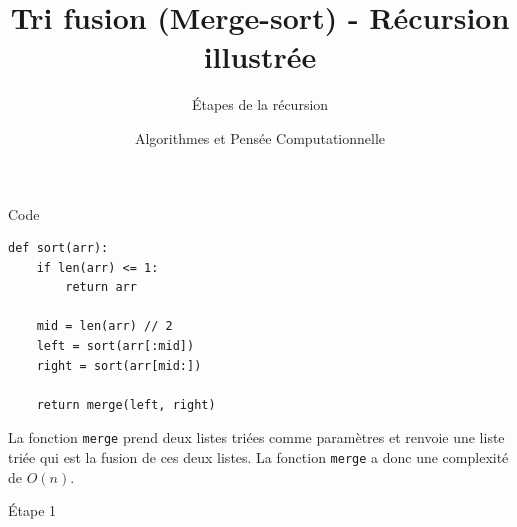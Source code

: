 \documentclass[aspectratio=169]{beamer}
\title{Tri fusion (Merge-sort) - Récursion illustrée}
\subtitle{Étapes de la récursion}
\author{Algorithmes et Pensée Computationnelle \newline \newline  {\small UNIL — École des Sciences Criminelles}}
\date{}
\begin{document}
\begin{frame}
\titlepage
\end{frame}

\begin{frame}[fragile]{Code}
\begin{center}
\begin{lstlisting}[style=pythonstyle, caption={Merge sort — Python}]
def sort(arr):
    if len(arr) <= 1:
        return arr
    
    mid = len(arr) // 2
    left = sort(arr[:mid])
    right = sort(arr[mid:])
    
    return merge(left, right)
\end{lstlisting}
\end{center}

La fonction \texttt{merge} prend deux listes triées comme paramètres et renvoie une liste triée qui est la fusion de ces deux listes. La fonction \texttt{merge} a donc une complexité de $O(n)$.
\end{frame}



\begin{frame}[fragile]{Étape 1}

\end{frame}
\end{document}
